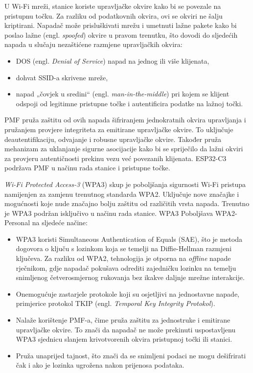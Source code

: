 U Wi-Fi mreži, stanice koriste upravljačke okvire kako bi se povezale na pristupnu točku. Za razliku od podatkovnih okvira, ovi se okviri ne šalju kriptirani. Napadač može prisluškivati mrežu i umetnuti lažne pakete kako bi poslao lažne (engl. \textit{spoofed}) okvire u pravom trenutku, što dovodi do sljedećih napada u slučaju nezaštićene razmjene upravljačkih okvira: 

\begin{itemize}
	\item DOS (engl. \textit{Denial of Service}) napad na jednog ili više klijenata,
	\item dohvat SSID-a skrivene mreže,
	\item napad „čovjek u sredini“ (engl. \textit{man-in-the-middle}) pri kojem se klijent odspoji od legitimne pristupne točke i autentificira podatke na lažnoj točki.
\end{itemize}  

PMF pruža zaštitu od ovih napada šifriranjem jednokratnih okvira upravljanja i pružanjem provjere integriteta za emitirane upravljačke okvire. To uključuje deautentifikaciju, odvajanje i robusne upravljačke okvire. Također pruža mehanizam za uklanjanje sigurne asocijacije kako bi se spriječilo da lažni okviri za provjeru autentičnosti prekinu vezu već povezanih klijenata. ESP32-C3 podržava PMF u načinu rada stanice i pristupne točke.

\textit{Wi-Fi Protected Access-3} (WPA3) skup je poboljšanja sigurnosti Wi-Fi pristupa namijenjen za zamjenu trenutnog standarda WPA2. Uključuje nove značajke i mogućnosti koje nude značajno bolju zaštitu od različitih vrsta napada. Trenutno je WPA3 podržan isključivo u načinu rada stanice. WPA3 Poboljšava WPA2-Personal na sljedeće načine:
\begin{itemize}
	\item WPA3 koristi Simultaneous Authentication of Equals (SAE), što je metoda dogovora o ključu s lozinkom koja se temelji na Diffie-Hellman razmjeni ključeva. Za razliku od WPA2, tehnologija je otporna na \textit{offline} napade rječnikom, gdje napadač pokušava odrediti zajedničku lozinku na temelju snimljenog četverosmjernog rukovanja bez ikakve daljnje mrežne interakcije.
	\item Onemogućuje zastarjele protokole koji su osjetljivi na jednostavne napade, primjerice protokol TKIP (engl. \textit{Temporal Key Integrity Protokol}).
	\item Nalaže korištenje PMF-a, čime pruža zaštitu za jednostruke i emitirane upravljačke okvire. To znači da napadač ne može prekinuti uspostavljenu WPA3 sjednicu slanjem krivotvorenih okvira pristupnoj točki ili stanici. 
	\item Pruža unaprijed tajnost, što znači da se snimljeni podaci ne mogu dešifrirati čak i ako je lozinka ugrožena nakon prijenosa podataka. \cite{espressif}
\end{itemize}

\eject
